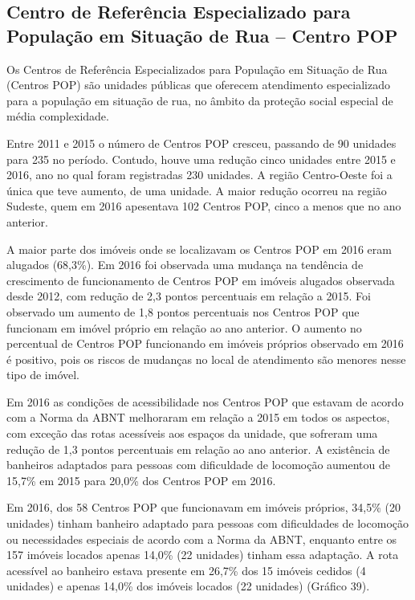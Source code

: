 \documentclass[
  brazilian]{report}
\begin{document}
\hypertarget{centro-de-referuxeancia-especializado-para-populauxe7uxe3o-em-situauxe7uxe3o-de-rua-centro-pop}{%
\subsection{Centro de Referência Especializado para População em
Situação de Rua -- Centro
POP}\label{centro-de-referuxeancia-especializado-para-populauxe7uxe3o-em-situauxe7uxe3o-de-rua-centro-pop}}

Os Centros de Referência Especializados para População em Situação de
Rua (Centros POP) são unidades públicas que oferecem atendimento
especializado para a população em situação de rua, no âmbito da proteção
social especial de média complexidade.

Entre 2011 e 2015 o número de Centros POP cresceu, passando de 90
unidades para 235 no período. Contudo, houve uma redução cinco unidades
entre 2015 e 2016, ano no qual foram registradas 230 unidades. A região
Centro-Oeste foi a única que teve aumento, de uma unidade. A maior
redução ocorreu na região Sudeste, quem em 2016 apesentava 102 Centros
POP, cinco a menos que no ano anterior.

A maior parte dos imóveis onde se localizavam os Centros POP em 2016
eram alugados (68,3\%). Em 2016 foi observada uma mudança na tendência
de crescimento de funcionamento de Centros POP em imóveis alugados
observada desde 2012, com redução de 2,3 pontos percentuais em relação a
2015. Foi observado um aumento de 1,8 pontos percentuais nos Centros POP
que funcionam em imóvel próprio em relação ao ano anterior. O aumento no
percentual de Centros POP funcionando em imóveis próprios observado em
2016 é positivo, pois os riscos de mudanças no local de atendimento são
menores nesse tipo de imóvel.

Em 2016 as condições de acessibilidade nos Centros POP que estavam de
acordo com a Norma da ABNT melhoraram em relação a 2015 em todos os
aspectos, com exceção das rotas acessíveis aos espaços da unidade, que
sofreram uma redução de 1,3 pontos percentuais em relação ao ano
anterior. A existência de banheiros adaptados para pessoas com
dificuldade de locomoção aumentou de 15,7\% em 2015 para 20,0\% dos
Centros POP em 2016.

Em 2016, dos 58 Centros POP que funcionavam em imóveis próprios, 34,5\%
(20 unidades) tinham banheiro adaptado para pessoas com dificuldades de
locomoção ou necessidades especiais de acordo com a Norma da ABNT,
enquanto entre os 157 imóveis locados apenas 14,0\% (22 unidades) tinham
essa adaptação. A rota acessível ao banheiro estava presente em 26,7\%
dos 15 imóveis cedidos (4 unidades) e apenas 14,0\% dos imóveis locados
(22 unidades) (Gráfico 39).
\end{document}
